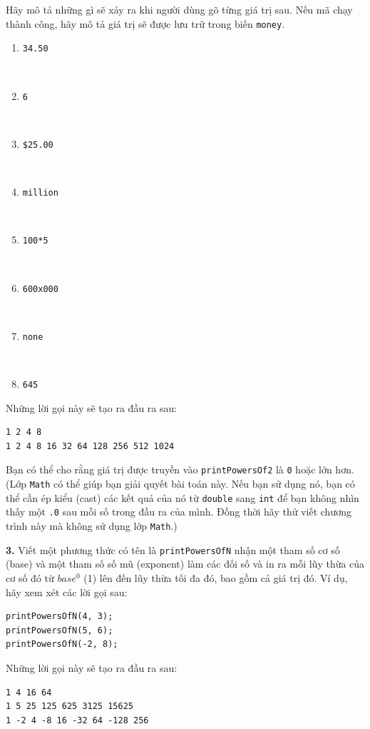 Hãy mô tả những gì sẽ xảy ra khi người dùng gõ từng giá trị sau. Nếu mã
chạy thành công, hãy mô tả giá trị sẽ được lưu trữ trong biến
\texttt{money}.

\begin{enumerate}
\def\labelenumi{\alph{enumi}.}
\tightlist
\item
  \texttt{34.50}\strut \\
\item
  \texttt{6}\strut \\
\item
  \texttt{\$25.00}\strut \\
\item
  \texttt{million}\strut \\
\item
  \texttt{100*5}\strut \\
\item
  \texttt{600x000}\strut \\
\item
  \texttt{none}\strut \\
\item
  \texttt{645}
\end{enumerate}

Những lời gọi này sẽ tạo ra đầu ra sau:

\begin{verbatim}
1 2 4 8
1 2 4 8 16 32 64 128 256 512 1024
\end{verbatim}

Bạn có thể cho rằng giá trị được truyền vào \texttt{printPowersOf2} là
\texttt{0} hoặc lớn hơn. (Lớp \texttt{Math} có thể giúp bạn giải quyết
bài toán này. Nếu bạn sử dụng nó, bạn có thể cần ép kiểu (cast) các kết
quả của nó từ \texttt{double} sang \texttt{int} để bạn không nhìn thấy
một \texttt{.0} sau mỗi số trong đầu ra của mình. Đồng thời hãy thử viết
chương trình này mà không sử dụng lớp \texttt{Math}.)

\textbf{3.} Viết một phương thức có tên là \texttt{printPowersOfN} nhận
một tham số cơ số (base) và một tham số số mũ (exponent) làm các đối số
và in ra mỗi lũy thừa của cơ số đó từ \(base^0\) (1) lên đến lũy thừa
tối đa đó, bao gồm cả giá trị đó. Ví dụ, hãy xem xét các lời gọi sau:

\begin{verbatim}
printPowersOfN(4, 3);
printPowersOfN(5, 6);
printPowersOfN(-2, 8);
\end{verbatim}

Những lời gọi này sẽ tạo ra đầu ra sau:

\begin{verbatim}
1 4 16 64
1 5 25 125 625 3125 15625
1 -2 4 -8 16 -32 64 -128 256
\end{verbatim}

